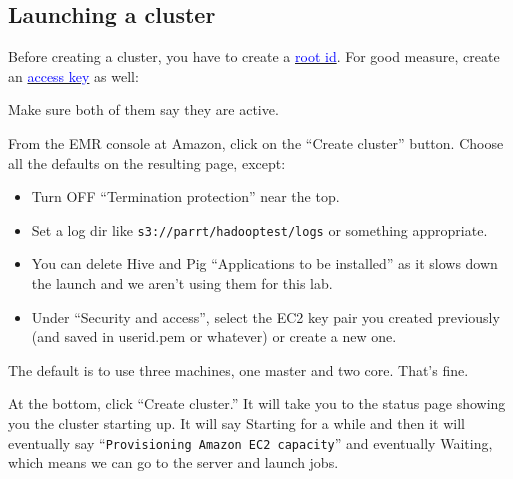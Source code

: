 \begin{fullwidth}
\subsection{Launching a cluster}

Before creating a cluster, you have to create a \href{http://sfu-innovation.github.io/474-14-1/access-keys-tut.html}{\textcolor{blue}{root id}}. For good measure, create an \href{http://sfu-innovation.github.io/474-14-1/access-keys-tut.html}{\textcolor{blue}{access key}} as well:


\noindent Make sure both of them say they are active.  
 
From the EMR console at Amazon, click on the ``Create cluster'' button. Choose all the defaults on the resulting page, except:

\begin{itemize}
\item Turn OFF ``Termination protection'' near the top.
\item Set a log dir like {\tt s3://parrt/hadooptest/logs} or something appropriate.
\item You can delete Hive and Pig ``Applications to be installed'' as it slows down the launch and we aren't using  them for this lab. 
\item  Under ``Security and access'', select the EC2 key pair you created previously (and saved in userid.pem or whatever) or create a new one.
\end{itemize}

\noindent The default is to use three machines, one master and two core. That's fine.

At the bottom, click ``Create cluster.''  It will take you to the status page showing you the cluster starting up. It will say Starting for a while and then it will eventually say ``{\tt Provisioning Amazon EC2 capacity}'' and eventually Waiting, which means we can go to the server and launch jobs. 


\end{fullwidth}
